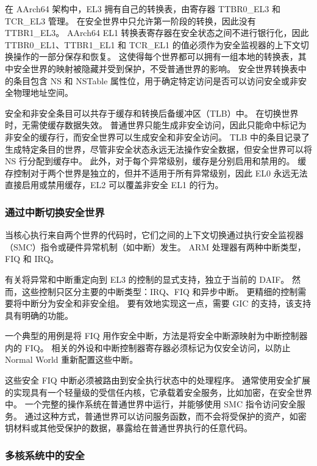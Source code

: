 在 AArch64 架构中，EL3 拥有自己的转换表，由寄存器 TTBR0\_EL3 和 TCR\_EL3 管理。
在安全世界中只允许第一阶段的转换，因此没有 TTBR1\_EL3。
AArch64 EL1 转换表寄存器在安全状态之间不进行银行化，因此 TTBR0\_EL1、TTBR1\_EL1 和 TCR\_EL1 的值必须作为安全监视器的上下文切换操作的一部分保存和恢复。
这使得每个世界都可以拥有一组本地的转换表，其中安全世界的映射被隐藏并受到保护，不受普通世界的影响。
安全世界转换表中的条目包含 NS 和 NSTable 属性位，用于确定特定访问是否可以访问安全或非安全物理地址空间。

安全和非安全条目可以共存于缓存和转换后备缓冲区（TLB）中。
在切换世界时，无需使缓存数据失效。
普通世界只能生成非安全访问，因此只能命中标记为非安全的缓存行，而安全世界可以生成安全和非安全访问。
TLB 中的条目记录了生成特定条目的世界，尽管非安全状态永远无法操作安全数据，但安全世界可以将 NS 行分配到缓存中。
此外，对于每个异常级别，缓存是分别启用和禁用的。
缓存控制对于两个世界是独立的，但并不适用于所有异常级别，因此 EL0 永远无法直接启用或禁用缓存，EL2 可以覆盖非安全 EL1 的行为。

\subsubsection{通过中断切换安全世界}

当核心执行来自两个世界的代码时，它们之间的上下文切换通过执行安全监视器（SMC）指令或硬件异常机制（如中断）发生。
ARM 处理器有两种中断类型，FIQ 和 IRQ。


有关将异常和中断重定向到 EL3 的控制的显式支持，独立于当前的 DAIF。
然而，这些控制只区分主要的中断类型：IRQ、FIQ 和异步中断。
更精细的控制需要将中断分为安全和非安全组。
要有效地实现这一点，需要 GIC 的支持，该支持具有明确的功能。

一个典型的用例是将 FIQ 用作安全中断，方法是将安全中断源映射为中断控制器内的 FIQ。
相关的外设和中断控制器寄存器必须标记为仅安全访问，以防止 Normal World 重新配置这些中断。


这些安全 FIQ 中断必须被路由到安全执行状态中的处理程序。
通常使用安全扩展的实现具有一个轻量级的受信任内核，它承载着安全服务，比如加密，在安全世界中。
一个完整的操作系统在普通世界中运行，并能够使用 SMC 指令访问安全服务。
通过这种方式，普通世界可以访问服务函数，而不会将受保护的资产，如密钥材料或其他受保护的数据，暴露给在普通世界执行的任意代码。

\subsubsection{多核系统中的安全}

